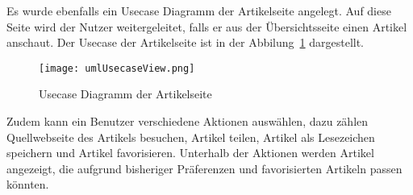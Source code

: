 Es wurde ebenfalls ein Usecase Diagramm der Artikelseite angelegt. Auf diese Seite
wird der Nutzer weitergeleitet, falls er aus der Übersichtsseite einen Artikel anschaut.
Der Usecase der Artikelseite ist in der Abbilung~\ref{fig:usecaseView} dargestellt.
\begin{figure}
    \texttt{[image: umlUsecaseView.png]}
    \caption{Usecase Diagramm der Artikelseite}
    \label{fig:usecaseView}
\end{figure}
Zudem kann ein Benutzer verschiedene Aktionen auswählen, dazu zählen Quellwebseite des Artikels besuchen, Artikel teilen, Artikel als 
Lesezeichen speichern und Artikel favorisieren. Unterhalb der Aktionen werden Artikel angezeigt, die aufgrund bisheriger Präferenzen und 
favorisierten Artikeln passen könnten.
